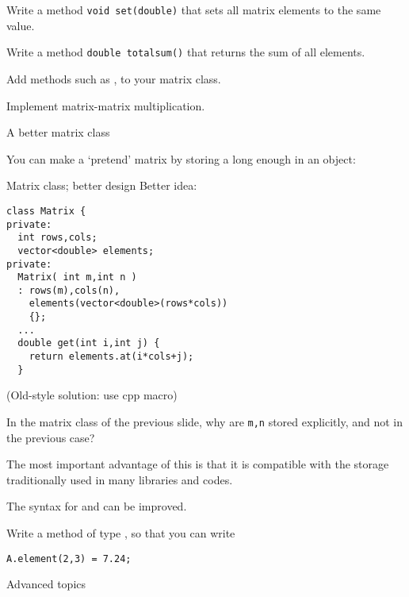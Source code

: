 \begin{exercise}
  \label{ex:matrix-set-sum}
  Write a method \lstinline+void set(double)+ that sets all
  matrix elements to the same value.

  Write a method \lstinline+double totalsum()+ that returns
  the sum of all elements.
\end{exercise}

\begin{exercise}
  \label{ex:matrix-methods}
  Add methods such as ,  to your matrix class.

  Implement matrix-matrix multiplication.
\end{exercise}

 {A better matrix class}

You can make a `pretend' matrix by storing a long enough  in
an object:
%

\begin{slide}{Matrix class; better design}
  \label{sl:matrix-class-cont}
  Better idea:
  \lstset{style=snippetcode}
\begin{lstlisting}
class Matrix {
private:
  int rows,cols;
  vector<double> elements;
private:
  Matrix( int m,int n )
  : rows(m),cols(n),
    elements(vector<double>(rows*cols))
    {};
  ...
  double get(int i,int j) {
    return elements.at(i*cols+j);
  }
\end{lstlisting}
(Old-style solution: use cpp macro)
\end{slide}

\begin{exercise}
  \label{ex:matrixclass-rowcol2}
  In the matrix class of the previous slide,
  why are \lstinline{m,n} stored explicitly, and not in the
  previous case?
\end{exercise}

The most important advantage of this is that it is compatible with
the storage traditionally used in 
many libraries and codes.

The syntax for  and  can be improved.
\begin{exercise}
  Write a method  of type , so that you can write
\begin{lstlisting}
A.element(2,3) = 7.24;
\end{lstlisting}
\end{exercise}

 {Advanced topics}

